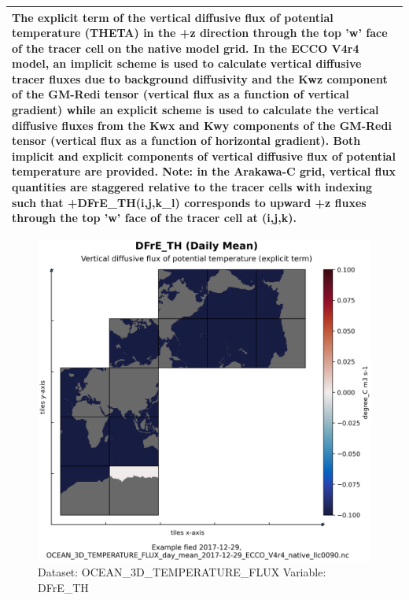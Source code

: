 \begin{longtable}{|p{}|p{}|p{}|p{}|}
\multicolumn{4}{|p{1\textwidth}|}{The explicit term of the vertical diffusive flux of potential temperature (THETA) in the +z direction through the top 'w' face of the tracer cell on the native model grid. In the ECCO V4r4 model, an implicit scheme is used to calculate vertical diffusive tracer fluxes due to background diffusivity and the Kwz component of the GM-Redi tensor (vertical flux as a function of vertical gradient) while an explicit scheme is used to calculate the vertical diffusive fluxes from the Kwx and Kwy components of the GM-Redi tensor (vertical flux as a function of horizontal gradient). Both implicit and explicit components of vertical diffusive flux of potential temperature are provided. Note: in the Arakawa-C grid, vertical flux quantities are staggered relative to the tracer cells with indexing such that +DFrE\_TH(i,j,k\_l) corresponds to upward +z fluxes through the top 'w' face of the tracer cell at (i,j,k).} \\ \hline
\end{longtable}

\begin{figure}[H]
\centering
\includegraphics[width=\textwidth]{../images/plots/native_plots/Ocean_Three-Dimensional_Potential_Temperature_Fluxes/DFrE_TH.png}
\caption{Dataset: OCEAN\_3D\_TEMPERATURE\_FLUX Variable: DFrE\_TH}
\label{tab:table-OCEAN_3D_TEMPERATURE_FLUX_DFrE_TH-Plot}
\end{figure}
\pagebreak
